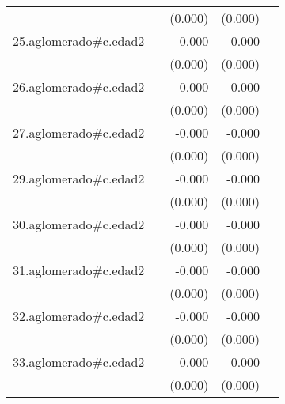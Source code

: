 {\begin{longtable}{l*{4}{D{.}{.}{-1}}}
            &                     &     (0.000)         &     (0.000)         &                     \\
\addlinespace
25.aglomerado#c.edad2&                     &      -0.000         &      -0.000         &                     \\
            &                     &     (0.000)         &     (0.000)         &                     \\
\addlinespace
26.aglomerado#c.edad2&                     &      -0.000         &      -0.000\sym{*}  &                     \\
            &                     &     (0.000)         &     (0.000)         &                     \\
\addlinespace
27.aglomerado#c.edad2&                     &      -0.000         &      -0.000         &                     \\
            &                     &     (0.000)         &     (0.000)         &                     \\
\addlinespace
29.aglomerado#c.edad2&                     &      -0.000         &      -0.000         &                     \\
            &                     &     (0.000)         &     (0.000)         &                     \\
\addlinespace
30.aglomerado#c.edad2&                     &      -0.000\sym{*}  &      -0.000\sym{**} &                     \\
            &                     &     (0.000)         &     (0.000)         &                     \\
\addlinespace
31.aglomerado#c.edad2&                     &      -0.000\sym{**} &      -0.000\sym{***}&                     \\
            &                     &     (0.000)         &     (0.000)         &                     \\
\addlinespace
32.aglomerado#c.edad2&                     &      -0.000         &      -0.000\sym{***}&                     \\
            &                     &     (0.000)         &     (0.000)         &                     \\
\addlinespace
33.aglomerado#c.edad2&                     &      -0.000         &      -0.000\sym{***}&                     \\
            &                     &     (0.000)         &     (0.000)         &                     \\

\end{longtable}}
